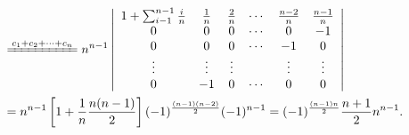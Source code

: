 \begin{jie}
$$\begin{aligned}
    &  \xlongequal{c_1+c_2+\cd+c_n} 
    n^{n-1} \left|
      \begin{array}{cccccc}
        1+\sum_{i-1}^{n-1}\frac in   &  \frac 1n & \frac 2n & \cd &  \frac{n-2}n & \frac{n-1}n\\
        0   &  0 &  0 & \cd &   0  & -1 \\
        0   &  0 &  0 & \cd &  -1  & 0\\
        \vd & \vd & \vd&     & \vd  & \vd \\
        0   & -1 &  0 & \cd &   0   & 0
      \end{array}       
    \right|\\
    &  = n^{n-1} \left[ 1 + \frac 1n \frac {n(n-1)}2\right] 
    (-1)^{\frac{(n-1)(n-2)}2}(-1)^{n-1} = (-1)^{\frac{(n-1)n}2} \frac{n+1}2 n^{n-1}.
  \end{aligned}
  $$
\end{jie}


